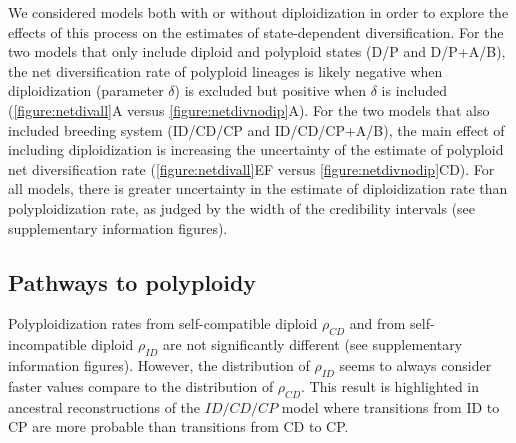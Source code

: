 We considered models both with or without diploidization in order to explore the effects of this process on the estimates of state-dependent diversification.
For the two models that only include diploid and polyploid states (D/P and D/P+A/B), the net diversification rate of polyploid lineages is likely negative when diploidization (parameter $\delta$) is excluded but positive when $\delta$ is included (\cref{figure:netdivall}A versus \cref{figure:netdivnodip}A).
For the two models that also included breeding system (ID/CD/CP and ID/CD/CP+A/B), the main effect of including diploidization is increasing the uncertainty of the estimate of polyploid net diversification rate (\cref{figure:netdivall}EF versus \cref{figure:netdivnodip}CD).
For all models, there is greater uncertainty in the estimate of diploidization rate than polyploidization rate, as judged by the width of the credibility intervals (see supplementary information figures). %

\subsection{Pathways to polyploidy}


Polyploidization rates from self-compatible diploid $\rho_{CD}$ and from self-incompatible diploid $\rho_{ID}$ are not significantly different (see supplementary information figures).
However, the distribution of $\rho_{ID}$ seems to always consider faster values compare to the distribution of $\rho_{CD}$.
This result is highlighted in ancestral reconstructions of the $ID/CD/CP$ model where transitions from ID to CP are more probable than transitions from CD to CP. %


